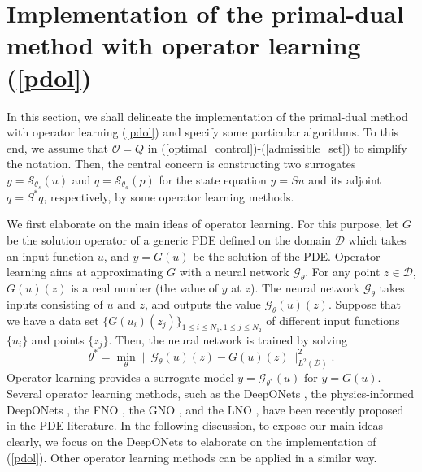 \documentclass[final]{siamart171218}
\theoremstyle{remark}
\begin{document}
\section{Implementation of the primal-dual method with operator learning (\ref{pdol})}\label{se: pdol}
In this section, we shall delineate the implementation of the primal-dual method with operator learning (\ref{pdol}) and specify some particular algorithms. To this end, we assume that $\mathcal{O}=Q$ in (\ref{optimal_control})-(\ref{admissible_set}) to simplify the notation. Then,  the central concern is constructing two surrogates $y=\mathcal{S}_{\theta_s}(u)$ and $q=\mathcal{S}_{\theta_a}(p)$ for the state equation $y=Su$ and its adjoint $q=S^*q$, respectively, by some operator learning methods.

We first elaborate on the main ideas of operator learning.
For this purpose, let $G$ be the solution operator of a generic PDE defined on the domain $\mathcal{D}$ which takes an input function $u$, and $y=G(u)$ be the solution of the PDE. Operator learning aims at approximating  $G$ with a neural network  $\mathcal{G}_{\theta}$. For any point $z\in\mathcal{D}$, $G(u)(z)$ is a real number (the value of $y$ at $z$). The neural network $\mathcal{G}_{\theta}$ takes inputs consisting of $u$ and $z$, and outputs the value $\mathcal{G}_{\theta}(u)(z)$. Suppose that we have a data set $\{G(u_i)(z_j)\}_{1\leq i\leq N_1, 1\leq j\leq N_2}$ of different input functions $\{u_i\}$ and points $\{z_j\}$. Then, the neural network is trained by solving
$$
\theta^*=\min_{\theta}\|\mathcal{G}_{\theta}(u)(z)-G(u)(z)\|_{L^2(\mathcal{D})}^2.
$$
Operator learning provides a surrogate model $y=\mathcal{G}_{\theta^*}(u)$ for $y=G(u)$. Several operator learning methods, such as the DeepONets \cite{lu2021learning}, the physics-informed DeepONets \cite{wang2021}, the FNO \cite{li2020FNO}, the GNO \cite{li2020GNO}, and the LNO \cite{cao2023}, have been recently proposed in the PDE literature. In the following discussion, to expose our main ideas clearly, we focus on the DeepONets \cite{wang2021} to elaborate on the implementation of (\ref{pdol}). Other operator learning methods can be applied in a similar way.
\end{document}
